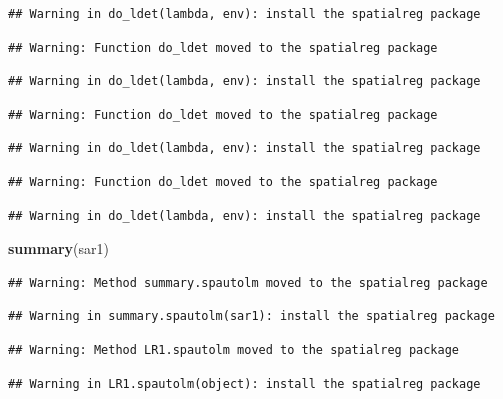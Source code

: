 \documentclass[11pt,]{article}
\newenvironment{Shaded}{\begin{snugshade}}{\end{snugshade}}
\newcommand{\KeywordTok}[1]{\textcolor[rgb]{0.13,0.29,0.53}{\textbf{#1}}}
\newcommand{\NormalTok}[1]{#1}
\begin{document}
\begin{verbatim}
## Warning in do_ldet(lambda, env): install the spatialreg package
\end{verbatim}

\begin{verbatim}
## Warning: Function do_ldet moved to the spatialreg package
\end{verbatim}

\begin{verbatim}
## Warning in do_ldet(lambda, env): install the spatialreg package
\end{verbatim}

\begin{verbatim}
## Warning: Function do_ldet moved to the spatialreg package
\end{verbatim}

\begin{verbatim}
## Warning in do_ldet(lambda, env): install the spatialreg package
\end{verbatim}

\begin{verbatim}
## Warning: Function do_ldet moved to the spatialreg package
\end{verbatim}

\begin{verbatim}
## Warning in do_ldet(lambda, env): install the spatialreg package
\end{verbatim}

\begin{Shaded}
\begin{Highlighting}[]
\KeywordTok{summary}\NormalTok{(sar1)}
\end{Highlighting}
\end{Shaded}

\begin{verbatim}
## Warning: Method summary.spautolm moved to the spatialreg package
\end{verbatim}

\begin{verbatim}
## Warning in summary.spautolm(sar1): install the spatialreg package
\end{verbatim}

\begin{verbatim}
## Warning: Method LR1.spautolm moved to the spatialreg package
\end{verbatim}

\begin{verbatim}
## Warning in LR1.spautolm(object): install the spatialreg package
\end{verbatim}
\end{document}
